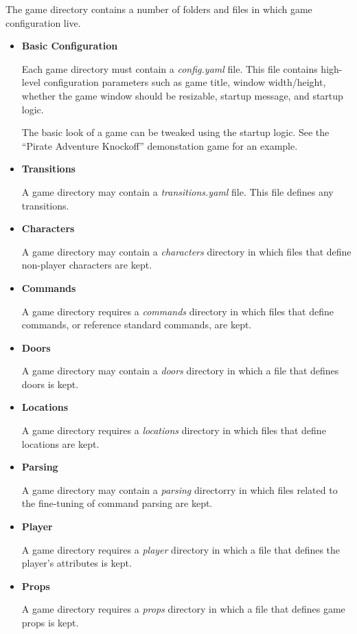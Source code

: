 \documentclass[letterpaper,10pt,english]{manual}
\begin{document}
The game directory contains a number of folders and files in which game configuration live.
\begin{itemize}
\item {} 
\textbf{Basic Configuration}

Each game directory must contain a \emph{config.yaml} file. This file contains high-level configuration parameters such as game title, window width/height, whether the game window should be resizable, startup message, and startup logic.

The basic look of a game can be tweaked using the startup logic. See the ``Pirate Adventure Knockoff'' demonstation game for an example.

\item {} 
\textbf{Transitions}

A game directory may contain a \emph{transitions.yaml} file. This file defines any transitions.

\item {} 
\textbf{Characters}

A game directory may contain a \emph{characters} directory in which files that define non-player characters are kept.

\item {} 
\textbf{Commands}

A game directory requires a \emph{commands} directory in which files that define commands, or reference standard commands, are kept.

\item {} 
\textbf{Doors}

A game directory may contain a \emph{doors} directory in which a file that defines doors is kept.

\item {} 
\textbf{Locations}

A game directory requires a \emph{locations} directory in which files that define locations are kept.

\item {} 
\textbf{Parsing}

A game directory may contain a \emph{parsing} directorry in which files related to the fine-tuning of command parsing are kept.

\item {} 
\textbf{Player}

A game directory requires a \emph{player} directory in which a file that defines the player's attributes is kept.

\item {} 
\textbf{Props}

A game directory requires a \emph{props} directory in which a file that defines game props is kept.

\end{itemize}
\end{document}
